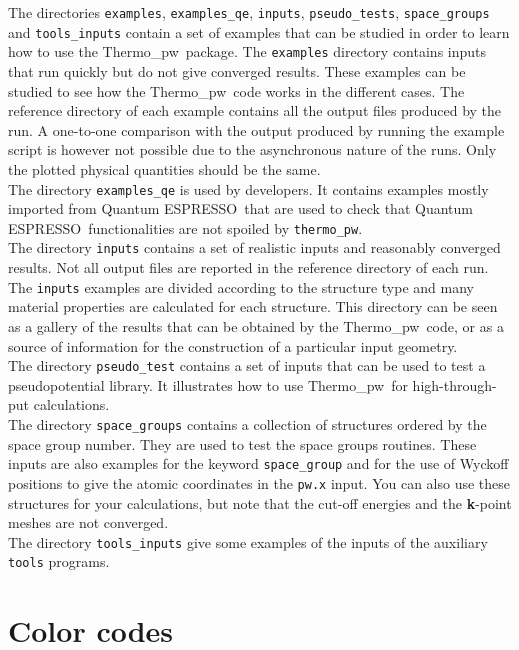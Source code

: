 \documentclass[12pt,a4paper,twoside]{report}
\def\qe{{\sc Quantum ESPRESSO}}
\def\thermo{{\sc Thermo\_pw}}
\begin{document}
The directories \texttt{examples}, \texttt{examples\_qe}, \texttt{inputs}, 
\texttt{pseudo\_tests}, \texttt{space\_groups} and \texttt{tools\_inputs} 
contain a set of examples that can be studied in order to learn how to 
use the \thermo\ package. The \texttt{examples} directory contains inputs 
that run quickly but do not give converged results. These examples can 
be studied 
to see how the \thermo\ code works in the different cases. The
reference directory of each example contains all the output
files produced by the run. A one-to-one comparison with the output
produced by running the example script is however not possible due to the
asynchronous nature of the runs. Only the plotted physical quantities 
should be the same. \\
The directory \texttt{examples\_qe} is used by developers. It
contains examples mostly imported from \qe\ that are used to check that
\qe\ functionalities are not spoiled by \texttt{thermo\_pw}. \\
The directory \texttt{inputs} contains a set
of realistic inputs and reasonably converged results. Not all
output files are reported in the reference directory of each run. 
The \texttt{inputs} examples are divided according to the structure type
and many material properties are calculated for each structure.
This directory can be seen as a gallery of the results that can be
obtained by the \thermo\ code, or as a source of information for the
construction of a particular input geometry. \\
The directory \texttt{pseudo\_test} contains a set of inputs that can
be used to test a pseudopotential library. It illustrates how to use \thermo\ 
for high-through-put calculations. \\
The directory \texttt{space\_groups} contains a collection of structures
ordered by the space group number. They are used to test the space
groups routines. These inputs are also examples for the
keyword \texttt{space\_group} and for the use of Wyckoff positions to give the
atomic coordinates in the \texttt{pw.x} input. You can also use these
structures for your calculations, but note that the cut-off energies and
the {\bf k}-point meshes are not converged. \\
The directory \texttt{tools\_inputs} give some examples of the inputs of
the auxiliary \texttt{tools} programs.



\newpage
{\color{dark-blue}\chapter{Color codes}}
\color{black}
\end{document}

